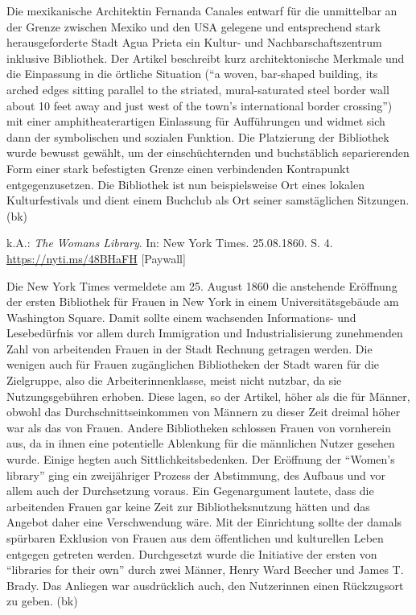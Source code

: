 \documentclass[a4paper,
fontsize=11pt,
oneside,
numbers=noperiodatend,
parskip=half-,
bibliography=totoc,
final
]{scrartcl}
\begin{document}
Die mexikanische Architektin Fernanda Canales entwarf für die
unmittelbar an der Grenze zwischen Mexiko und den USA gelegene und
entsprechend stark herausgeforderte Stadt Agua Prieta ein Kultur- und
Nachbarschaftszentrum inklusive Bibliothek. Der Artikel beschreibt kurz
architektonische Merkmale und die Einpassung in die örtliche Situation
(\enquote{a woven, bar-shaped building, its arched edges sitting
parallel to the striated, mural-saturated steel border wall about 10
feet away and just west of the town's international border crossing})
mit einer amphitheaterartigen Einlassung für Aufführungen und widmet
sich dann der symbolischen und sozialen Funktion. Die Platzierung der
Bibliothek wurde bewusst gewählt, um der einschüchternden und
buchstäblich separierenden Form einer stark befestigten Grenze einen
verbindenden Kontrapunkt entgegenzusetzen. Die Bibliothek ist nun
beispielsweise Ort eines lokalen Kulturfestivals und dient einem
Buchclub als Ort seiner samstäglichen Sitzungen. (bk)

k.A.: \emph{The Woman\textquotesingle s Library}. In: New York Times.
25.08.1860. S. 4. \url{https://nyti.ms/48BHaFH} {[}Paywall{]}

Die New York Times vermeldete am 25. August 1860 die anstehende
Eröffnung der ersten Bibliothek für Frauen in New York in einem
Universitätsgebäude am Washington Square. Damit sollte einem wachsenden
Informations- und Lesebedürfnis vor allem durch Immigration und
Industrialisierung zunehmenden Zahl von arbeitenden Frauen in der Stadt
Rechnung getragen werden. Die wenigen auch für Frauen zugänglichen
Bibliotheken der Stadt waren für die Zielgruppe, also die
Arbeiterinnenklasse, meist nicht nutzbar, da sie Nutzungsgebühren
erhoben. Diese lagen, so der Artikel, höher als die für Männer, obwohl
das Durchschnittseinkommen von Männern zu dieser Zeit dreimal höher war
als das von Frauen. Andere Bibliotheken schlossen Frauen von vornherein
aus, da in ihnen eine potentielle Ablenkung für die männlichen Nutzer
gesehen wurde. Einige hegten auch Sittlichkeitsbedenken. Der Eröffnung
der \enquote{Women's library} ging ein zweijähriger Prozess der
Abstimmung, des Aufbaus und vor allem auch der Durchsetzung voraus. Ein
Gegenargument lautete, dass die arbeitenden Frauen gar keine Zeit zur
Bibliotheksnutzung hätten und das Angebot daher eine Verschwendung wäre.
Mit der Einrichtung sollte der damals spürbaren Exklusion von Frauen aus
dem öffentlichen und kulturellen Leben entgegen getreten werden.
Durchgesetzt wurde die Initiative der ersten von \enquote{libraries for
their own} durch zwei Männer, Henry Ward Beecher und James T. Brady. Das
Anliegen war ausdrücklich auch, den Nutzerinnen einen Rückzugsort zu
geben. (bk)
\end{document}
